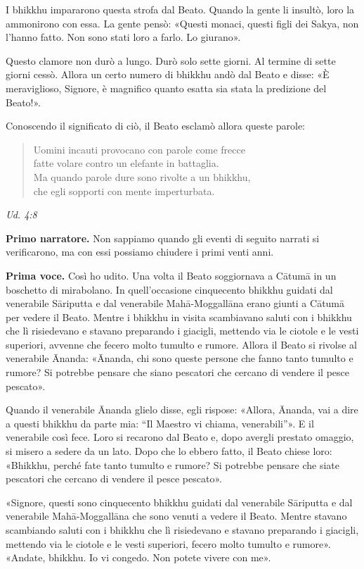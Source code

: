 I bhikkhu impararono questa strofa dal Beato. Quando la gente li
insultò, loro la ammonirono con essa. La gente pensò: «Questi monaci,
questi figli dei Sakya, non l’hanno fatto. Non sono stati loro a farlo.
Lo giurano».


Questo clamore non durò a lungo. Durò solo sette giorni. Al termine di
sette giorni cessò. Allora un certo numero di bhikkhu andò dal Beato e
disse: «È meraviglioso, Signore, è magnifico quanto esatta sia stata la
predizione del Beato!».


Conoscendo il significato di ciò, il Beato esclamò allora queste parole:


\begin{quotation}
Uomini incauti provocano con parole come frecce \\
fatte volare contro un elefante in battaglia. \\
Ma quando parole dure sono rivolte a un bhikkhu, \\
che egli sopporti con mente imperturbata.
\end{quotation}

\emph{Ud. 4:8}


\textbf{Primo narratore.} Non sappiamo quando gli eventi di seguito narrati si
verificarono, ma con essi possiamo chiudere i primi venti anni.


\textbf{Prima voce.} Così ho udito. Una volta il Beato soggiornava a Cātumā in un
boschetto di mirabolano. In quell’occasione cinquecento bhikkhu guidati
dal venerabile Sāriputta e dal venerabile Mahā-Moggallāna erano giunti a
Cātumā per vedere il Beato. Mentre i bhikkhu in visita scambiavano
saluti con i bhikkhu che lì risiedevano e stavano preparando i giacigli,
mettendo via le ciotole e le vesti superiori, avvenne che fecero molto
tumulto e rumore. Allora il Beato si rivolse al venerabile Ānanda:
«Ānanda, chi sono queste persone che fanno tanto tumulto e rumore? Si
potrebbe pensare che siano pescatori che cercano di vendere il pesce
pescato».


Quando il venerabile Ānanda glielo disse, egli rispose: «Allora, Ānanda,
vai a dire a questi bhikkhu da parte mia: “Il Maestro vi chiama,
venerabili”». E il venerabile così fece. Loro si recarono dal Beato e,
dopo avergli prestato omaggio, si misero a sedere da un lato. Dopo che
lo ebbero fatto, il Beato chiese loro: «Bhikkhu, perché fate tanto
tumulto e rumore? Si potrebbe pensare che siate pescatori che cercano di
vendere il pesce pescato».


«Signore, questi sono cinquecento bhikkhu guidati dal venerabile
Sāriputta e dal venerabile Mahā-Moggallāna che sono venuti a vedere il
Beato. Mentre stavano scambiando saluti con i bhikkhu che lì risiedevano
e stavano preparando i giacigli, mettendo via le ciotole e le vesti
superiori, fecero molto tumulto e rumore». «Andate, bhikkhu. Io vi
congedo. Non potete vivere con me».


